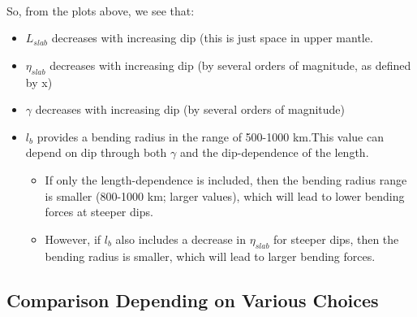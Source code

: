 \documentclass[11pt]{article}
\begin{document}
    \begin{center}
    \end{center}
    { \hspace*{\fill} \\}
    
    So, from the plots above, we see that: 
    \begin{itemize}
    \item \(L_{slab}\) decreases with increasing dip (this is just space in upper mantle. 
    \item  \(\eta_{slab}\) decreases with increasing dip (by several orders of magnitude, as defined by x) 
\item  \(\gamma\) decreases with increasing dip (by several
orders of magnitude) 
\item  \(l_b\) provides a bending radius in the range of 500-1000 km.This value can depend on dip through both \(\gamma\) and
the dip-dependence of the length. 
\begin{itemize}
\item If only the length-dependence is included, then the bending radius range is smaller (800-1000 km; larger
values), which will lead to lower bending forces at steeper dips. 
\item  However, if \(l_b\) also includes a decrease in \(\eta_{slab}\) for
steeper dips, then the bending radius is smaller, which will lead to larger bending forces.
\end{itemize}
\end{itemize}

    \hypertarget{comparison-depending-on-various-choices}{%
\subsection{Comparison Depending on Various
Choices}\label{comparison-depending-on-various-choices}}
\end{document}
